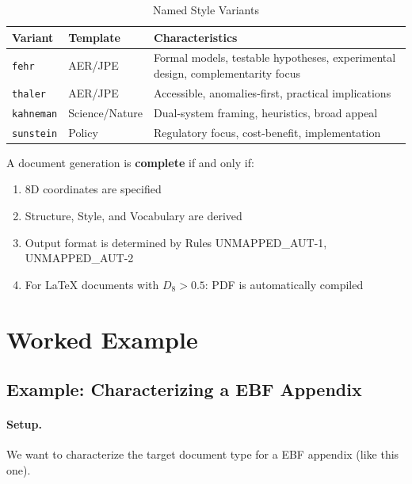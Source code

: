\begin{table}[htbp]
\centering
\caption{Named Style Variants}
\label{tab:style-variants}
\renewcommand{\arraystretch}{1.3}
\begin{tabular}{@{}llp{6cm}@{}}
\toprule
\textbf{Variant} & \textbf{Template} & \textbf{Characteristics} \\
\midrule
\texttt{fehr} & AER/JPE & Formal models, testable hypotheses, experimental design, complementarity focus \\
\texttt{thaler} & AER/JPE & Accessible, anomalies-first, practical implications \\
\texttt{kahneman} & Science/Nature & Dual-system framing, heuristics, broad appeal \\
\texttt{sunstein} & Policy & Regulatory focus, cost-benefit, implementation \\
\bottomrule
\end{tabular}
\end{table}

\begin{tcolorbox}[colback=green!5!white, colframe=green!75!black,
    title=Axiom UNMAPPED_AUT-1: Output Completeness]
A document generation is \textbf{complete} if and only if:
\begin{enumerate}[nosep]
\item 8D coordinates are specified
\item Structure, Style, and Vocabulary are derived
\item Output format is determined by Rules UNMAPPED_AUT-1, UNMAPPED_AUT-2
\item For LaTeX documents with $D_8 > 0.5$: PDF is automatically compiled
\end{enumerate}
\end{tcolorbox}


\section{Worked Example}
\label{sec:doctype-example}

\subsection{Example: Characterizing a EBF Appendix}

\paragraph{Setup.} We want to characterize the target document type for a
EBF appendix (like this one).

